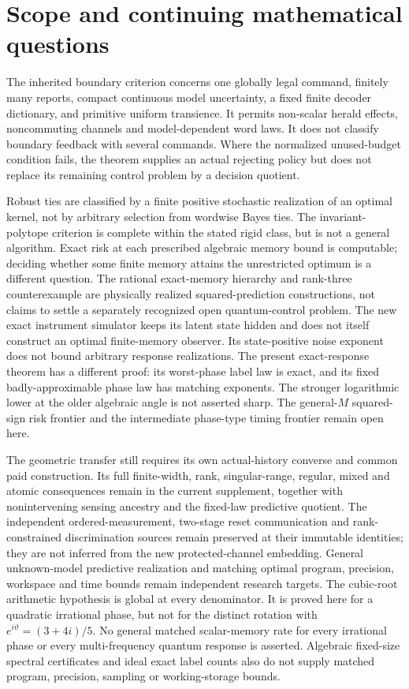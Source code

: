 \section{Scope and continuing mathematical questions}\label{sec:r69-scope}
The inherited boundary criterion concerns one globally legal command, finitely many reports, compact continuous model uncertainty, a fixed finite decoder dictionary, and primitive uniform transience. It permits non-scalar herald effects, noncommuting channels and model-dependent word laws. It does not classify boundary feedback with several commands. Where the normalized unused-budget condition fails, the theorem supplies an actual rejecting policy but does not replace its remaining control problem by a decision quotient.

Robust ties are classified by a finite positive stochastic realization of an optimal kernel, not by arbitrary selection from wordwise Bayes ties. The invariant-polytope criterion is complete within the stated rigid class, but is not a general algorithm. Exact risk at each prescribed algebraic memory bound is computable; deciding whether some finite memory attains the unrestricted optimum is a different question. The rational exact-memory hierarchy and rank-three counterexample are physically realized squared-prediction constructions, not claims to settle a separately recognized open quantum-control problem. The new exact instrument simulator keeps its latent state hidden and does not itself construct an optimal finite-memory observer. Its state-positive noise exponent does not bound arbitrary response realizations. The present exact-response theorem has a different proof: its worst-phase label law is exact, and its fixed badly-approximable phase law has matching exponents. The stronger logarithmic lower at the older algebraic angle is not asserted sharp. The general-$M$ squared-sign risk frontier and the intermediate phase-type timing frontier remain open here.

The geometric transfer still requires its own actual-history converse and common paid construction. Its full finite-width, rank, singular-range, regular, mixed and atomic consequences remain in the current supplement, together with nonintervening sensing ancestry and the fixed-law predictive quotient. The independent ordered-measurement, two-stage reset communication and rank-constrained discrimination sources remain preserved at their immutable identities; they are not inferred from the new protected-channel embedding. General unknown-model predictive realization and matching optimal program, precision, workspace and time bounds remain independent research targets.
The cubic-root arithmetic hypothesis is global at every denominator. It is proved here for a quadratic irrational phase, but not for the distinct rotation with $e^{i\vartheta}=(3+4i)/5$. No general matched scalar-memory rate for every irrational phase or every multi-frequency quantum response is asserted. Algebraic fixed-size spectral certificates and ideal exact label counts also do not supply matched program, precision, sampling or working-storage bounds.


